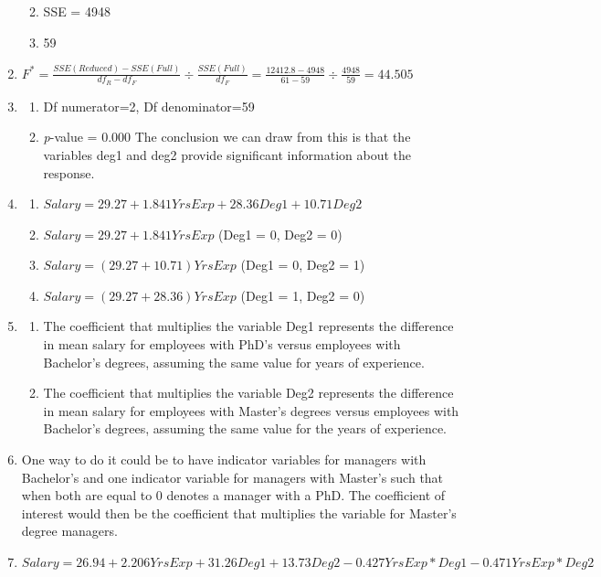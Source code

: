 \documentclass{article}
\providecommand{\tightlist}{%
      \setlength{\itemsep}{0pt}\setlength{\parskip}{0pt}}
\begin{document}
\begin{enumerate}
  \begin{enumerate}
  \def\labelenumii{\roman{enumii})}
  \tightlist
  \item
    SSE = 4948
  \item
    59
  \end{enumerate}
\item
  \(F^* = \frac{SSE(Reduced) - SSE(Full)}{df_R - df_F} \div \frac{SSE(Full)}{df_F} = \frac{12412.8 - 4948}{61 - 59} \div \frac{4948}{59} = 44.505\)
\item
  \begin{enumerate}
  \def\labelenumii{\roman{enumii})}
  \tightlist
  \item
    Df numerator=2, Df denominator=59
  \item
    \emph{p}-value = 0.000 The conclusion we can draw from this is that
    the variables deg1 and deg2 provide significant information about
    the response.
  \end{enumerate}
\item
  \begin{enumerate}
  \def\labelenumii{\roman{enumii})}
  \tightlist
  \item
    \(Salary = 29.27 + 1.841 YrsExp + 28.36 Deg1 + 10.71 Deg2\)
  \item
    \(Salary = 29.27 + 1.841 YrsExp\) (Deg1 = 0, Deg2 = 0)
  \item
    \(Salary = (29.27+10.71) YrsExp\) (Deg1 = 0, Deg2 = 1)
  \item
    \(Salary = (29.27+28.36) YrsExp\) (Deg1 = 1, Deg2 = 0)
  \end{enumerate}
\item
  \begin{enumerate}
  \def\labelenumii{\roman{enumii})}
  \tightlist
  \item
    The coefficient that multiplies the variable Deg1 represents the
    difference in mean salary for employees with PhD's versus employees
    with Bachelor's degrees, assuming the same value for years of
    experience.
  \item
    The coefficient that multiplies the variable Deg2 represents the
    difference in mean salary for employees with Master's degrees versus
    employees with Bachelor's degrees, assuming the same value for the
    years of experience.
  \end{enumerate}
\item
  One way to do it could be to have indicator variables for managers
  with Bachelor's and one indicator variable for managers with Master's
  such that when both are equal to 0 denotes a manager with a PhD. The
  coefficient of interest would then be the coefficient that multiplies
  the variable for Master's degree managers.
\item
  \(Salary = 26.94 + 2.206 YrsExp + 31.26 Deg1 + 13.73 Deg2 - 0.427 YrsExp*Deg1 - 0.471 YrsExp*Deg2\)
\end{enumerate}
\end{document}
